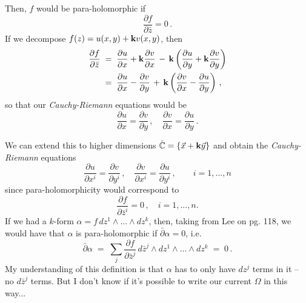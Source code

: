 \documentclass[12pt,letterpaper]{amsart}%
\numberwithin{mycounter}{section}
\theoremstyle{plain}
\numberwithin{equation}{section}
\theoremstyle{definition}
\begin{document}
{\begin{equation*}
\end{equation*}
Then, $f$ would be para-holomorphic if 
\begin{equation*}
    \frac{\partial f}{\partial \bar{z}}=0\,.
\end{equation*}
If we decompose $f(z)=u(x,y)+\textrm{\bf k}v(x,y)$, then 
\begin{align*}
    \frac{\partial f}{\partial \bar{z}} 
    \;&=\; \frac{\partial u}{\partial x} + \textrm{\bf k} \frac{\partial v}{\partial x} \,-\, \textrm{\bf k}\left(\frac{\partial u}{\partial y} + \textrm{\bf k} \frac{\partial v}{\partial y}\right) \\
    \;&=\; \frac{\partial u}{\partial x} - \frac{\partial v}{\partial y}  \,+\, \textrm{\bf k}\left(\frac{\partial v}{\partial x}-\frac{\partial u}{\partial y} \right)\,,
\end{align*}
so that our \textit{Cauchy-Riemann} equations would be 
\begin{equation*}
     \frac{\partial u}{\partial x} = \frac{\partial v}{\partial y} \,,\quad \frac{\partial v}{\partial x}=\frac{\partial u}{\partial y}\,.
\end{equation*}

We can extend this to higher dimensions $\tilde{\mathbb{C}}=\{\vec{x}+\textrm{\bf k}\vec{y}\}$ and obtain the \textit{Cauchy-Riemann} equations
\begin{equation*}
     \frac{\partial u}{\partial x^i} = \frac{\partial v}{\partial y^i} \,,\quad \frac{\partial v}{\partial x^i}=\frac{\partial u}{\partial y^i}\,, \qquad i=1,...,n
\end{equation*}
since para-holomorphicity would correspond to 
\begin{equation*}
    \frac{\partial f}{\partial \bar{z}^i}=0\,, \quad i=1,...,n.
\end{equation*}
If we had a $k$-form $\alpha=f\,dz^1\wedge...\wedge dz^k$, then, taking from Lee on pg. 118, we would have that $\alpha$ is para-holomorphic if 
$\bar{\partial}\alpha=0$, i.e. 
\begin{equation*}
    \bar{\partial}\alpha \;=\; \sum_j\frac{\partial f}{\partial \bar{z}^j}\,d\bar{z}^j\wedge dz^1\wedge...\wedge dz^k \;=\;0\,.
\end{equation*}
My understanding of this definition is that $\alpha$ has to only have $dz^j$ terms in it -- no $d\bar{z}^j$ terms. But I don't know if it's possible to write our current $\Omega$ in this way...

\bigskip

}
\end{document}
